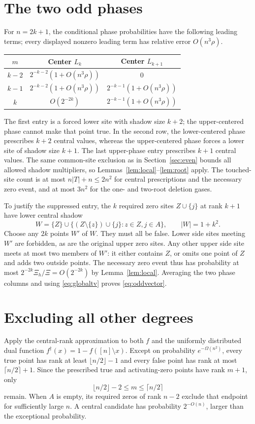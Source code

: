 \documentclass[11pt]{article}
\theoremstyle{remark}\newtheorem{remark}[theorem]{Remark}
\begin{document}
\section{The two odd phases}\label{sec:odd}
For $n=2k+1$, the conditional phase probabilities have the following
leading terms; every displayed nonzero leading term has relative error
$O(n^3\rho)$.
\begin{center}
\begin{tabular}{ccc}\toprule
$m$ & Center $L_k$ & Center $L_{k+1}$\\\midrule
$k-2$ & $2^{-k-2}(1+O(n^3\rho))$ & $0$\\
$k-1$ & $2^{-k-2}(1+O(n^3\rho))$ & $2^{-k-1}(1+O(n^3\rho))$\\
$k$ & $O(2^{-2k})$ & $2^{-k-1}(1+O(n^3\rho))$\\\bottomrule
\end{tabular}
\end{center}
The first entry is a forced lower site with shadow size $k+2$;
the upper-centered phase cannot make that point true. In the second row,
the lower-centered phase prescribes $k+2$ central values, whereas the
upper-centered phase forces a lower site of shadow size $k+1$.
The last upper-phase entry prescribes $k+1$ central values. The same
common-site exclusion as in Section~\ref{sec:even} bounds all allowed
shadow multipliers, so Lemmas~\ref{lem:local}--\ref{lem:root} apply.
The touched-site count is at most $n|T|+n\le2n^2$ for central
prescriptions and the necessary zero event, and at most $3n^2$ for
the one- and two-root deletion gases.

To justify the suppressed entry, the $k$ required zero sites $Z\cup\{j\}$
at rank $k+1$ have lower central shadow
\[
 W=\{Z\}\cup\{(Z\setminus\{z\})\cup\{j\}:z\in Z,j\in A\},
 \qquad |W|=1+k^2.
\]
Choose any $2k$ points $W'$ of $W$. They must all be false. Lower side
sites meeting $W'$ are forbidden, as are the original upper zero sites.
Any other upper side site meets at most two members of $W'$: it either
contains $Z$, or omits one point of $Z$ and adds two outside points.
The necessary zero event thus has probability at most
$2^{-2k}\Xi_h/\Xi=O(2^{-2k})$ by Lemma~\ref{lem:local}.
Averaging the two phase columns and using \eqref{eq:globaltv} proves
\eqref{eq:oddvector}.

\section{Excluding all other degrees}\label{sec:localization}
Apply the central-rank approximation to both $f$ and the uniformly
distributed dual function $f^\dagger(x)=1-f([n]\setminus x)$. Except on
probability $e^{-\Omega(n^2)}$, every true point has rank at least
$\lfloor n/2\rfloor-1$ and every false point has rank at most
$\lceil n/2\rceil+1$. Since the prescribed true and activating-zero
points have rank $m+1$, only
\[
 \lfloor n/2\rfloor-2\le m\le\lceil n/2\rceil
\]
remain. When $A$ is empty, its required zeros of rank $n-2$ exclude that
endpoint for sufficiently large $n$. A central candidate has probability
$2^{-O(n)}$, larger than the exceptional probability.
\end{document}
